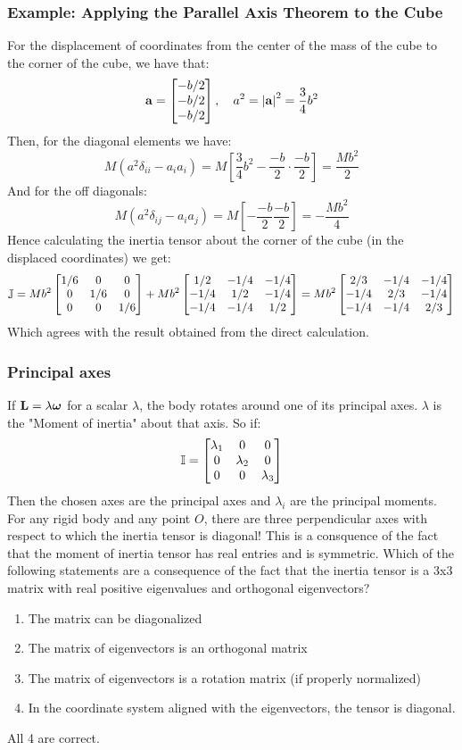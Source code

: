 \documentclass[../PHYS306Notes.tex]{subfiles}
\begin{document}
\subsubsection{Example: Applying the Parallel Axis Theorem to the Cube}
For the displacement of coordinates from the center of the mass of the cube to the corner of the cube, we have that:
\[\mathbf{a} = \begin{bmatrix}-b/2 \\ -b/2 \\ -b/2\end{bmatrix}, \quad a^2 = \abs{\mathbf{a}}^2 = \frac{3}{4}b^2\]
Then, for the diagonal elements we have:
\[M(a^2\delta_{ii} - a_ia_i) = M\left[\frac{3}{4}b^2 - \frac{-b}{2}\cdot\frac{-b}{2}\right] = \frac{Mb^2}{2}\]
And for the off diagonals:
\[M(a^2\delta_{ij} - a_ia_j) = M\left[-\frac{-b}{2}\frac{-b}{2}\right] = -\frac{Mb^2}{4}\]
Hence calculating the inertia tensor about the corner of the cube (in the displaced coordinates) we get:
\[\mathbb{J} = Mb^2\begin{bmatrix}1/6 & 0 & 0 \\ 0 & 1/6 & 0 \\ 0 & 0 & 1/6\end{bmatrix} + Mb^2\begin{bmatrix}1/2 & -1/4 & -1/4 \\ -1/4 & 1/2 & -1/4 \\ -1/4 & -1/4 & 1/2\end{bmatrix} = Mb^2\begin{bmatrix}2/3 & -1/4 & -1/4 \\ -1/4 & 2/3 & -1/4 \\ -1/4 & -1/4 & 2/3\end{bmatrix}\]
Which agrees with the result obtained from the direct calculation.

\subsubsection{Principal axes}
If $\mathbf{L} = \lambda\bm{\omega}$ for a scalar $\lambda$, the body rotates around one of its principal axes. $\lambda$ is the "Moment of inertia" about that axis. So if:
\[\mathbb{I} = \begin{bmatrix}\lambda_1 & 0 & 0 \\ 0 & \lambda_2 & 0 \\ 0 & 0 & \lambda_3\end{bmatrix}\]
Then the chosen axes are the principal axes and $\lambda_i$ are the principal moments. For any rigid body and any point $O$, there are three perpendicular axes with respect to which the inertia tensor is diagonal! This is a consquence of the fact that the moment of inertia tensor has real entries and is symmetric. 
\newline Which of the following statements are a consequence of the fact that the inertia tensor is a 3x3 matrix with real positive eigenvalues and orthogonal eigenvectors?
\begin{enumerate}
    \item The matrix can be diagonalized
    \item The matrix of eigenvectors is an orthogonal matrix
    \item The matrix of eigenvectors is a rotation matrix (if properly normalized)
    \item In the coordinate system aligned with the eigenvectors, the tensor is diagonal.
\end{enumerate}
\begin{s}
    All 4 are correct. 
\end{s}
\end{document}
